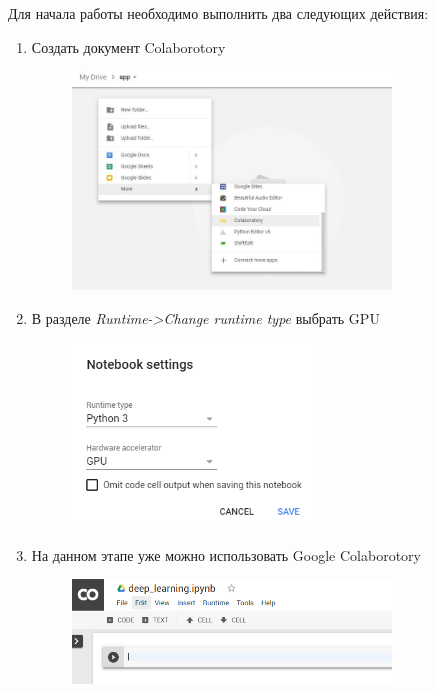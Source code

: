 Для начала работы необходимо выполнить два следующих действия:
\begin{enumerate}\label{alg:colab_settings}
\item Создать документ Colaborotory
\begin{figure}[h]
    \centering
    \includegraphics[width=0.8\textwidth]{colab_settings_1.jpeg}
    \label{fig:colab_settings_1}
\end{figure}

\item В разделе \textsl{Runtime->Change runtime type} выбрать GPU
\begin{figure}[h]
    \centering
    \includegraphics[width=0.6\textwidth]{colab_settings_2.png}
    \label{fig:colab_settings_2}
\end{figure}

\newpage

\item На данном этапе уже можно использовать Google Colaborotory
\begin{figure}[h]
    \centering
    \includegraphics[width=0.8\textwidth]{colab_settings_3.png}
    \label{fig:colab_settings_3}
\end{figure}


\end{enumerate}
